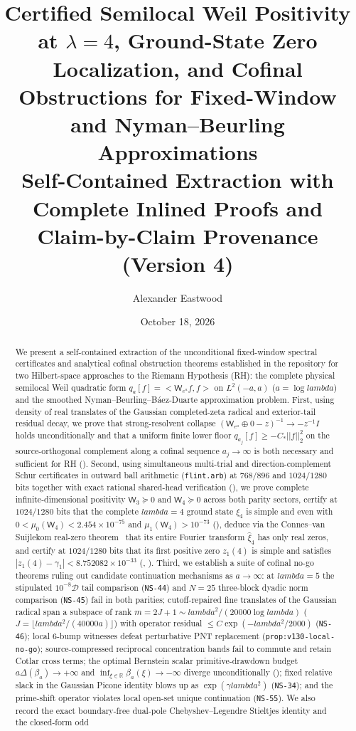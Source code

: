 \documentclass[11pt]{article}
\title{\textbf{Certified Semilocal Weil Positivity at $\lambda = 4$, Ground-State Zero Localization, and Cofinal Obstructions for Fixed-Window and Nyman--Beurling Approximations}\\[4pt]
\large Self-Contained Extraction with Complete Inlined Proofs and Claim-by-Claim Provenance (Version 4)}
\author{Alexander Eastwood}
\date{October 18, 2026}
\def\lambda{lambda}%
\def\norm#1{||#1||}%
\def\ip#1#2{<#1,#2>}%
\theoremstyle{remark}
\newcommand{\norm}[1]{\left\lVert #1\right\rVert}
\newcommand{\ip}[2]{\left\langle #1,#2\right\rangle}
\begin{document}
\maketitle

\begin{abstract}
We present a self-contained extraction of the unconditional fixed-window spectral certificates and analytical cofinal obstruction theorems established in the repository  for two Hilbert-space approaches to the Riemann Hypothesis (RH): the complete physical semilocal Weil quadratic form $q_a[f] = \ip{\mathsf W_{e^a} f}{f}$ on $L^2(-a,a)$ ($a = \log\lambda$) and the smoothed Nyman--Beurling--B\'aez-Duarte approximation problem. First, using density of real translates of the Gaussian completed-zeta radical and exterior-tail residual decay, we prove that strong-resolvent collapse $(\mathsf W_{e^a}\oplus 0 - z)^{-1} \to -z^{-1}I$ holds unconditionally and that a uniform finite lower floor $q_{a_j}[f] \ge -C_*\norm{f}_2^2$ on the source-orthogonal complement along a cofinal sequence $a_j \to \infty$ is both necessary and sufficient for RH (). Second, using simultaneous multi-trial and direction-complement Schur certificates in outward ball arithmetic (\texttt{flint.arb}) at $768/896$ and $1024/1280$ bits together with exact rational shared-head verification (), we prove complete infinite-dimensional positivity $\mathsf W_3 \succeq 0$ and $\mathsf W_4 \succeq 0$ across both parity sectors, certify at $1024/1280$ bits that the complete $\lambda = 4$ ground state $\xi_4$ is simple and even with $0 < \mu_0(\mathsf W_4) < 2.454 \times 10^{-75}$ and $\mu_1(\mathsf W_4) > 10^{-73}$ (), deduce via the Connes--van Suijlekom real-zero theorem~\cite{ConnesVanSuijlekom2025} that its entire Fourier transform $\widehat{\xi}_4$ has only real zeros, and certify at $1024/1280$ bits that its first positive zero $z_1(4)$ is simple and satisfies $|z_1(4) - \gamma_1| < 8.752082 \times 10^{-33}$ (, ). Third, we establish a suite of cofinal no-go theorems ruling out candidate continuation mechanisms as $a \to \infty$: at $\lambda = 5$ the stipulated $10^{-8}\mathcal D$ tail comparison (\texttt{NS-44}) and $N = 25$ three-block dyadic norm comparison (\texttt{NS-45}) fail in both parities; cutoff-repaired fine translates of the Gaussian radical span a subspace of rank $m = 2J+1 \sim \lambda^2/(20000\log\lambda)$ ($J = \lfloor\lambda^2/(40000a)\rfloor$) with operator residual $\le C\exp(-\lambda^2/2000)$ (\texttt{NS-46}); local $6$-bump witnesses defeat perturbative PNT replacement (\texttt{prop:v130-local-no-go}); source-compressed reciprocal concentration bands fail to commute and retain Cotlar cross terms; the optimal Bernstein scalar primitive-drawdown budget $a\Delta(\beta_a) \to +\infty$ and $\inf_{\xi\in\mathbb R}\beta_a(\xi) \to -\infty$ diverge unconditionally (); fixed relative slack in the Gaussian Picone identity blows up as $\exp(\gamma\lambda^2)$ (\texttt{NS-34}); and the prime-shift operator violates local open-set unique continuation (\texttt{NS-55}). We also record the exact boundary-free dual-pole Chebyshev--Legendre Stieltjes identity and the closed-form odd 
\end{abstract}
\end{document}
